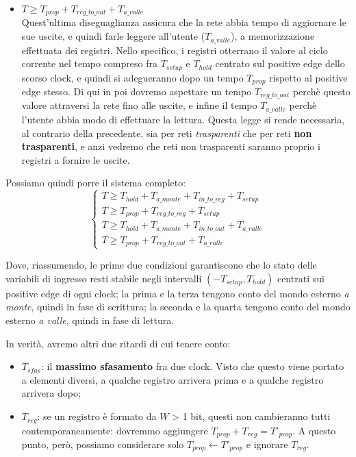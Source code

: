 \documentclass[a4paper,11pt]{article}
\begin{document}
\begin{itemize}
	\item $T \geq T_{prop} + T_{reg\_to\_out} + T_{a\_valle}$ \\ 
		Quest'ultima diseguaglianza assicura che la rete abbia tempo di aggiornare le sue uscite, e quindi farle leggere all'utente ($T_{a\_valle}$), a memorizzazione effettuata dei registri.
		Nello specifico, i registri otterrano il valore al ciclo corrente nel tempo compreso fra $T_{setup}$ e $T_{hold}$ centrato sul positive edge dello scorso clock, e quindi si adegueranno dopo un tempo $T_{prop}$ rispetto al positive edge stesso.
		Di qui in poi dovremo aspettare un tempo $T_{reg\_to\_out}$ perchè questo valore attraversi la rete fino alle uscite, e infine il tempo $T_{a\_valle}$ perchè l'utente abbia modo di effettuare la lettura.
		Questa legge si rende necessaria, al contrario della precedente, sia per reti \textit{trasparenti} che per reti \textbf{non trasparenti}, e anzi vedremo che reti non trasparenti saranno proprio i registri a fornire le uscite. 
\end{itemize}

Possiamo quindi porre il sistema completo: 
\[
	\begin{cases}
		T \geq T_{hold} + T_{a\_monte} + T_{in\_to\_reg} + T_{setup} \\ 
		T \geq T_{prop} + T_{reg\_to\_reg} + T_{setup} \\ 
		T \geq T_{hold} + T_{a\_monte} + T_{in\_to\_out} + T_{a\_valle} \\
		T \geq T_{prop} + T_{reg\_to\_out} + T_{a\_valle}
	\end{cases}
\]

Dove, riassumendo, le prime due condizioni garantiscono che lo stato delle variabili di ingresso resti stabile negli intervalli $(-T_{setup}, T_{hold})$ centrati sui positive edge di ogni clock; la prima e la terza tengono conto del mondo esterno \textit{a monte}, quindi in fase di scrittura; la seconda e la quarta tengono conto del mondo esterno \textit{a valle}, quindi in fase di lettura. 

In verità, avremo altri due ritardi di cui tenere conto:
\begin{itemize}
	\item $T_{sfas}$: il \textbf{massimo sfasamento} fra due clock.
		Visto che questo viene portato a elementi diversi, a qualche registro arrivera prima e a qualche registro arrivera dopo;
	\item $T_{reg}$: se un registro è formato da $W$ > 1 bit, questi non cambieranno tutti contemporaneamente: dovremmo aggiungere $T_{prop} + T_{reg} = T'_{prop}$. A questo punto, però, possiamo considerare solo $T_{prop} \leftarrow T'_{prop}$ e ignorare $T_{reg}$.
\end{itemize}
\end{document}
